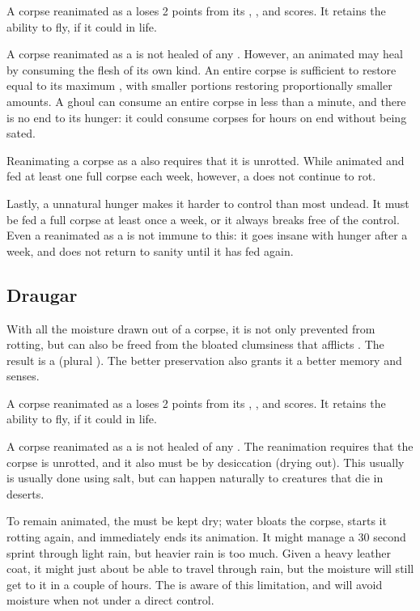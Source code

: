 A corpse reanimated as a  loses 2 points from its , , and  scores.
It retains the ability to fly, if it could in life.

A corpse reanimated as a  is not healed of any {\damage}.
However, an animated  may heal {\damage} by consuming the flesh of its own kind.
An entire corpse is sufficient to restore {\damage} equal to its maximum , with smaller portions restoring proportionally smaller amounts.
A ghoul can consume an entire corpse in less than a minute, and there is no end to its hunger: it could consume corpses for hours on end without being sated.

Reanimating a corpse as a  also requires that it is unrotted.
While animated and fed at least one full corpse each week, however, a  does not continue to rot.

Lastly, a  unnatural hunger makes it harder to control than most undead.
It must be fed a full corpse at least once a week, or it always breaks free of the  control.
Even a  reanimated as a  is not immune to this: it goes insane with hunger after a week, and does not return to sanity until it has fed again.

\subsection{Draugar}

With all the moisture drawn out of a corpse, it is not only prevented from rotting, but can also be freed from the bloated clumsiness that afflicts .
The result is a  (plural ).
The better preservation also grants it a better memory and senses.

A corpse reanimated as a  loses 2 points from its , , and  scores.
It retains the ability to fly, if it could in life.

A corpse reanimated as a  is not healed of any {\damage}.
The reanimation requires that the corpse is unrotted, and it also must be {\embalmed} by desiccation (drying out).
This usually is usually done using salt, but can happen naturally to creatures that die in deserts.

To remain animated, the  must be kept dry; water bloats the corpse, starts it rotting again, and immediately ends its animation.
It might manage a 30 second sprint through light rain, but heavier rain is too much.
Given a heavy leather coat, it might just about be able to travel through rain, but the moisture will still get to it in a couple of hours.
The  is aware of this limitation, and will avoid moisture when not under a  direct control.

